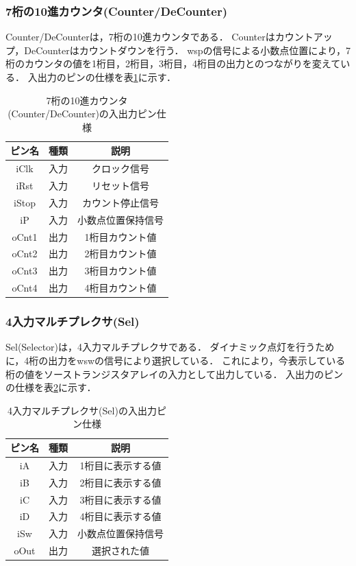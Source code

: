 \documentclass[a4paper,11pt]{ltjsarticle}
\begin{document}
\subsubsection{7桁の10進カウンタ(Counter/DeCounter)}
Counter/DeCounterは，7桁の10進カウンタである．
Counterはカウントアップ，DeCounterはカウントダウンを行う．
wspの信号による小数点位置により，7桁のカウンタの値を1桁目，2桁目，3桁目，4桁目の出力とのつながりを変えている．
入出力のピンの仕様を表\ref{tab:counter}に示す．
\begin{table}[H]
    \centering
    \caption{7桁の10進カウンタ(Counter/DeCounter)の入出力ピン仕様}
    \label{tab:counter}
    \begin{tabular}{|c|c|c|}
        \hline
        ピン名   & 種類 & 説明        \\
        \hline
        iClk  & 入力 & クロック信号    \\
        \hline
        iRst  & 入力 & リセット信号    \\
        \hline
        iStop & 入力 & カウント停止信号  \\
        \hline
        iP    & 入力 & 小数点位置保持信号 \\
        \hline
        oCnt1 & 出力 & 1桁目カウント値  \\
        \hline
        oCnt2 & 出力 & 2桁目カウント値  \\
        \hline
        oCnt3 & 出力 & 3桁目カウント値  \\
        \hline
        oCnt4 & 出力 & 4桁目カウント値  \\
        \hline
    \end{tabular}
\end{table}
\subsubsection{4入力マルチプレクサ(Sel)}
Sel(Selector)は，4入力マルチプレクサである．
ダイナミック点灯を行うために，4桁の出力をwswの信号により選択している．
これにより，今表示している桁の値をソーストランジスタアレイの入力として出力している．
入出力のピンの仕様を表\ref{tab:sel}に示す．
\begin{table}[H]
    \centering
    \caption{4入力マルチプレクサ(Sel)の入出力ピン仕様}
    \label{tab:sel}
    \begin{tabular}{|c|c|c|}
        \hline
        ピン名  & 種類 & 説明        \\
        \hline
        iA   & 入力 & 1桁目に表示する値 \\
        \hline
        iB   & 入力 & 2桁目に表示する値 \\
        \hline
        iC   & 入力 & 3桁目に表示する値 \\
        \hline
        iD   & 入力 & 4桁目に表示する値 \\
        \hline
        iSw  & 入力 & 小数点位置保持信号 \\
        \hline
        oOut & 出力 & 選択された値    \\
        \hline
    \end{tabular}
\end{table}
\end{document}

